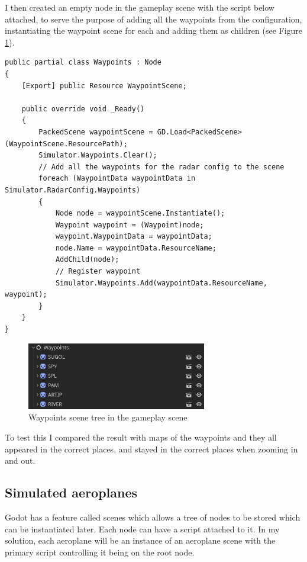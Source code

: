\documentclass{article}
\begin{document}
I then created an empty node in the gameplay scene with the script below attached, to serve the purpose of adding all the waypoints from the configuration, instantiating the waypoint scene for each and adding them as children (see Figure \ref{fig:wpscenetree2}).
\lstset{style=csharp}
\begin{lstlisting}[caption=Waypoints management script]
public partial class Waypoints : Node
{
    [Export] public Resource WaypointScene;

    public override void _Ready()
    {
        PackedScene waypointScene = GD.Load<PackedScene>(WaypointScene.ResourcePath);
        Simulator.Waypoints.Clear();
        // Add all the waypoints for the radar config to the scene
        foreach (WaypointData waypointData in Simulator.RadarConfig.Waypoints)
        {
            Node node = waypointScene.Instantiate();
            Waypoint waypoint = (Waypoint)node;
            waypoint.WaypointData = waypointData;
            node.Name = waypointData.ResourceName;
            AddChild(node);
            // Register waypoint
            Simulator.Waypoints.Add(waypointData.ResourceName, waypoint);
        }
    }
}
\end{lstlisting}
\begin{figure}[H]
\centering
\includegraphics[width=0.7\textwidth]{screenshots/wptree2.png}
\caption{\label{fig:wpscenetree2}Waypoints scene tree in the gameplay scene}
\end{figure}
To test this I compared the result with maps of the waypoints and they all appeared in the correct places, and stayed in the correct places when zooming in and out.

\subsection{Simulated aeroplanes}
Godot has a feature called scenes which allows a tree of nodes to be stored which can be instantiated later.
Each node can have a script attached to it.
In my solution, each aeroplane will be an instance of an aeroplane scene with the primary script controlling it being on the root node.
\end{document}

